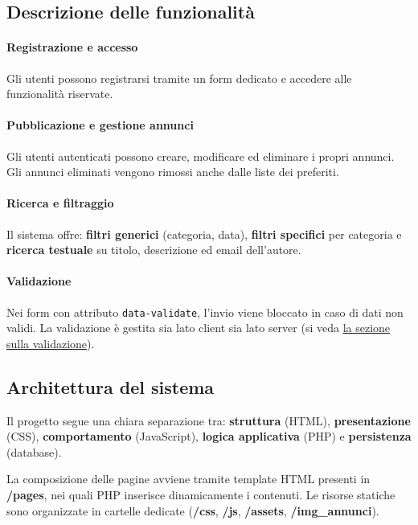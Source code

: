 \documentclass[a4paper,12pt]{article}
\begin{document}
\subsection{Descrizione delle funzionalità}

\paragraph{Registrazione e accesso}
Gli utenti possono registrarsi tramite un form dedicato e accedere alle funzionalità riservate.

\paragraph{Pubblicazione e gestione annunci}
Gli utenti autenticati possono creare, modificare ed eliminare i propri annunci.  
Gli annunci eliminati vengono rimossi anche dalle liste dei preferiti.

\paragraph{Ricerca e filtraggio}
Il sistema offre: \textbf{filtri generici} (categoria, data), \textbf{filtri specifici} per categoria e \textbf{ricerca testuale} su titolo, descrizione ed email dell’autore.

\paragraph{Validazione}
Nei form con attributo \texttt{data-validate}, l’invio viene bloccato in caso di dati non validi.  
La validazione è gestita sia lato client sia lato server (si veda \underline{\hyperref[sviluppo:validazione]{la sezione sulla validazione}}).

\subsection{Architettura del sistema}

Il progetto segue una chiara separazione tra: \textbf{struttura} (HTML), \textbf{presentazione} (CSS), \textbf{comportamento} (JavaScript), \textbf{logica applicativa} (PHP) e \textbf{persistenza} (database).

La composizione delle pagine avviene tramite template HTML presenti in \textbf{/pages}, 
nei quali PHP inserisce dinamicamente i contenuti.  
Le risorse statiche sono organizzate in cartelle dedicate (\textbf{/css}, \textbf{/js}, \textbf{/assets}, \textbf{/img\_annunci}).
\end{document}
